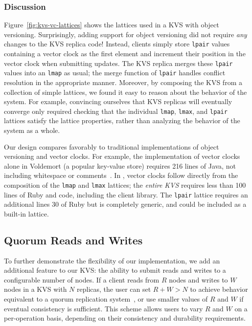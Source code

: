 \subsubsection{Discussion}
Figure~\ref{fig:kvs-vc-lattices} shows the lattices used in a KVS with object
versioning. Surprisingly, adding support for object versioning did not require
\emph{any} changes to the KVS replica code! Instead, clients simply store
\texttt{lpair} values containing a vector clock as the first element and
increment their position in the vector clock when submitting updates. The KVS
replica merges these \texttt{lpair} values into an \texttt{lmap} as usual; the
merge function of \texttt{lpair} handles conflict resolution in the appropriate
manner. Moreover, by composing the KVS from a collection of simple lattices, we
found it easy to reason about the behavior of the system. For example,
convincing ourselves that KVS replicas will eventually converge only required
checking that the individual \texttt{lmap}, \texttt{lmax}, and \texttt{lpair}
lattices satisfy the lattice properties, rather than analyzing the behavior of
the system as a whole.

Our design compares favorably to traditional implementations of object
versioning and vector clocks. For example, the implementation of vector clocks
alone in Voldemort (a popular key-value store) requires 216 lines of Java, not
including whitespace or comments~\cite{voldemort-vector-clock}. In \lang, vector
clocks follow directly from the composition of the \texttt{lmap} and
\texttt{lmax} lattices; the \emph{entire KVS} requires less than 100 lines of
Ruby and \lang code, including the client library. The \texttt{lpair} lattice
requires an additional lines 30 of Ruby but is completely generic, and could be
included as a built-in lattice.

\subsection{Quorum Reads and Writes}
To further demonstrate the flexibility of our implementation, we add an
additional feature to our KVS: the ability to submit reads and writes to a
configurable number of nodes. If a client reads from $R$ nodes and writes to $W$
nodes in a KVS with $N$ replicas, the user can set $R + W > N$ to achieve
behavior equivalent to a quorum replication system~\cite{Gifford1979}, or use
smaller values of $R$ and $W$ if eventual consistency is sufficient. This scheme
allows users to vary $R$ and $W$ on a per-operation basis, depending on their
consistency and durability requirements.

